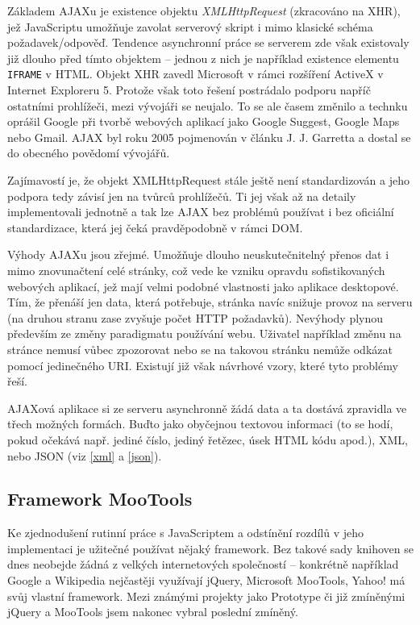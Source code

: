 Základem AJAXu je existence objektu {\it XMLHttpRequest} (zkracováno
na XHR), jež JavaScriptu umožňuje zavolat serverový skript i mimo
klasické schéma požadavek/odpověď. Tendence asynchronní práce se
serverem zde však existovaly již dlouho před tímto objektem --
jednou z nich je například existence elementu {\tt IFRAME} v HTML.
Objekt XHR zavedl Microsoft v rámci rozšíření ActiveX v Internet
Exploreru 5. Protože však toto řešení postrádalo podporu napříč
ostatními prohlížeči, mezi vývojáři se neujalo. To se ale časem
změnilo a technku oprášil Google při tvorbě webových aplikací jako
Google Suggest, Google Maps nebo Gmail. AJAX byl roku 2005 pojmenován
v článku J. J. Garretta \cite{ajaxArticle} a dostal se do obecného
povědomí vývojářů.

Zajímavostí je, že objekt XMLHttpRequest stále ještě není
standardizován a jeho podpora tedy závisí jen na 
tvůrců prohlížečů. Ti jej však až na detaily implementovali jednotně
a tak lze AJAX bez problémů používat i bez oficiální standardizace,
která jej čeká pravděpodobně v rámci DOM.

Výhody AJAXu jsou zřejmé. Umožňuje dlouho neuskutečnitelný přenos dat
i mimo znovunačtení celé stránky, což vede ke vzniku opravdu
sofistikovaných webových aplikací, jež mají velmi podobné vlastnosti
jako aplikace desktopové. Tím, že přenáší jen data, která potřebuje,
stránka navíc snižuje provoz na serveru (na druhou stranu zase
zvyšuje počet HTTP požadavků). Nevýhody plynou především ze změny
paradigmatu používání webu. Uživatel například změnu na stránce
nemusí vůbec zpozorovat nebo se na takovou stránku nemůže odkázat
pomocí jedinečného URI. Existují již však návrhové vzory, které tyto
problémy řeší.

AJAXová aplikace si ze serveru asynchronně žádá data a ta dostává
zpravidla ve třech možných formách. Buďto jako obyčejnou textovou
informaci (to se hodí, pokud očekává např. jediné číslo, jediný
řetězec, úsek HTML kódu apod.), XML, nebo JSON (viz \ref{xml} a
\ref{json}).

\subsection{Framework MooTools}
Ke zjednodušení rutinní práce s JavaScriptem a odstínění rozdílů v
jeho implementaci je užitečné používat nějaký framework. Bez takové sady
knihoven se dnes neobejde žádná z velkých internetových společností --
konkrétně například Google a Wikipedia nejčastěji využívají jQuery,
Microsoft MooTools, Yahoo! má svůj vlastní framework. Mezi známými projekty jako
Prototype či již zmíněnými jQuery a MooTools jsem nakonec vybral
poslední zmíněný.

